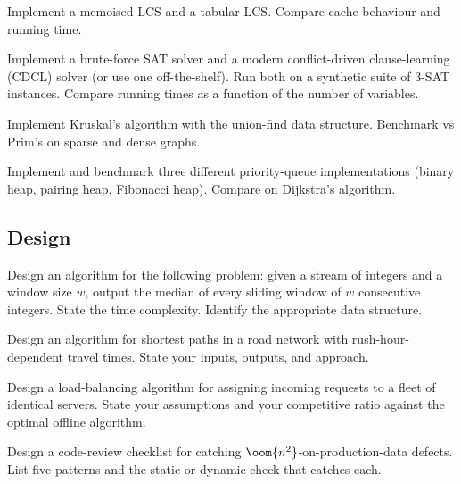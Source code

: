 \begin{exercise}
Implement a memoised LCS and a tabular LCS. Compare cache behaviour and running time.
\end{exercise}

\begin{exercise}
Implement a brute-force SAT solver and a modern conflict-driven clause-learning (CDCL) solver (or use one off-the-shelf). Run both on a synthetic suite of $3$-SAT instances. Compare running times as a function of the number of variables.
\end{exercise}

\begin{exercise}
Implement Kruskal's algorithm with the union-find data structure. Benchmark vs Prim's on sparse and dense graphs.
\end{exercise}

\begin{exercise}
Implement and benchmark three different priority-queue implementations (binary heap, pairing heap, Fibonacci heap). Compare on Dijkstra's algorithm.
\end{exercise}

\subsection*{Design}

\begin{exercise}
Design an algorithm for the following problem: given a stream of integers and a window size $w$, output the median of every sliding window of $w$ consecutive integers. State the time complexity. Identify the appropriate data structure.
\end{exercise}

\begin{exercise}
Design an algorithm for shortest paths in a road network with rush-hour-dependent travel times. State your inputs, outputs, and approach.
\end{exercise}

\begin{exercise}
Design a load-balancing algorithm for assigning incoming requests to a fleet of identical servers. State your assumptions and your competitive ratio against the optimal offline algorithm.
\end{exercise}

\begin{exercise}
Design a code-review checklist for catching $\oom{n^2}$-on-production-data defects. List five patterns and the static or dynamic check that catches each.
\end{exercise}

